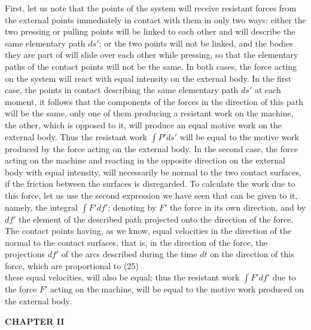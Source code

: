 \documentclass{book}
\begin{document}
First, let us note that the points of the system will receive resistant forces from the external points immediately in contact with them in only two ways: either the two pressing or pulling points will be linked to each other and will describe the same elementary path \( ds' \); or the two points will not be linked, and the bodies they are part of will slide over each other while pressing, so that the elementary paths of the contact points will not be the same. In both cases, the force acting on the system will react with equal intensity on the external body. In the first case, the points in contact describing the same elementary path \( ds' \) at each moment, it follows that the components of the forces in the direction of this path will be the same, only one of them producing a resistant work on the machine, the other, which is opposed to it, will produce an equal motive work on the external body. Thus the resistant work \( \int P' ds' \) will be equal to the motive work produced by the force acting on the external body. In the second case, the force acting on the machine and reacting in the opposite direction on the external body with equal intensity, will necessarily be normal to the two contact surfaces, if the friction between the surfaces is disregarded. To calculate the work due to this force, let us use the second expression we have seen that can be given to it, namely, the integral \( \int F' df' \); denoting by \( F' \) the force in its own direction, and by \( df' \) the element of the described path projected onto the direction of the force. The contact points having, as we know, equal velocities in the direction of the normal to the contact surfaces, that is, in the direction of the force, the projections \( df' \) of the arcs described during the time \( dt \) on the direction of this force, which are proportional to
\newpage
(25)\\
these equal velocities, will also be equal; thus the resistant work \( \int F' df' \) due to the force \( F' \) acting on the machine, will be equal to the motive work produced on the external body.












\newpage
\begin{center}
\huge\bfseries CHAPTER II
\end{center}
\vspace{10mm} %
\end{document}
